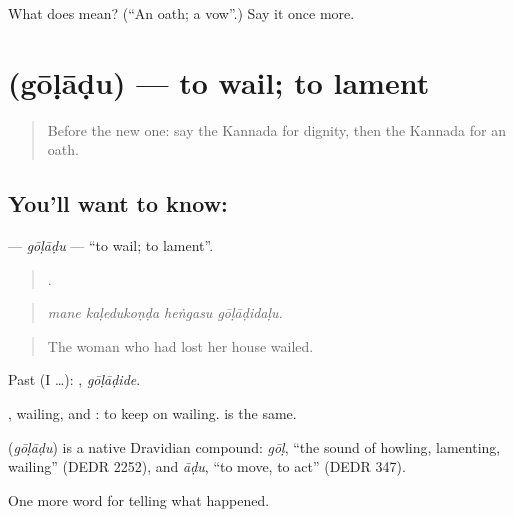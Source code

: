 \begin{tcolorbox}[breakable,colback=teal!4,colframe=teal!35!black,title={Before you move on}]
What does  mean? (\textquotedblleft{}An oath; a vow\textquotedblright{}.) Say it once more.
\end{tcolorbox}
\section[\texorpdfstring{\kn{ಗೋಳಾಡು} (gōḷāḍu)}{ಗೋಳಾಡು (gōḷāḍu)}]{ (gōḷāḍu) — to wail; to lament}

\label{lesson:KA-C366-goladu}



\begin{quote}
Before the new one: say the Kannada for dignity, then the Kannada for an oath.
\end{quote}

\subsection*{You'll want to know: }
\textbf{} — \emph{gōḷāḍu} — \textquotedblleft{}to wail; to lament\textquotedblright{}.

\begin{quote}
   .
\end{quote}

\begin{quote}
\emph{mane kaḷedukoṇḍa heṅgasu gōḷāḍidaḷu.}
\end{quote}

\begin{quote}
The woman who had lost her house wailed.
\end{quote}

Past (I …): , \emph{gōḷāḍide}.

, wailing, and : to keep on wailing.   is the same.

\begin{cousinweb}
\textbf{} (\emph{gōḷāḍu}) is a native Dravidian compound: \emph{gōḷ}, \textquotedblleft{}the sound of howling, lamenting, wailing\textquotedblright{} (DEDR 2252), and \emph{āḍu}, \textquotedblleft{}to move, to act\textquotedblright{} (DEDR 347).
\end{cousinweb}

\begin{grammarlens}[title={What you've built}]
One more word for telling what happened.
\end{grammarlens}

